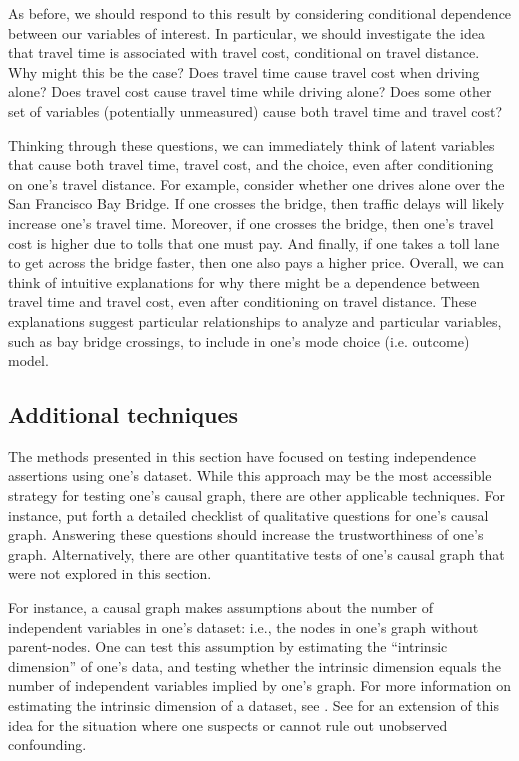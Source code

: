As before, we should respond to this result by considering conditional dependence between our variables of interest.
In particular, we should investigate the idea that travel time is associated with travel cost, conditional on travel distance.
Why might this be the case?
Does travel time cause travel cost when driving alone?
Does travel cost cause travel time while driving alone?
Does some other set of variables (potentially unmeasured) cause both travel time and travel cost?

Thinking through these questions, we can immediately think of latent variables that cause both travel time, travel cost, and the choice, even after conditioning on one's travel distance.
For example, consider whether one drives alone over the San Francisco Bay Bridge.
If one crosses the bridge, then traffic delays will likely increase one's travel time.
Moreover, if one crosses the bridge, then one's travel cost is higher due to tolls that one must pay.
And finally, if one takes a toll lane to get across the bridge faster, then one also pays a higher price.
Overall, we can think of intuitive explanations for why there might be a dependence between travel time and travel cost, even after conditioning on travel distance.
These explanations suggest particular relationships to analyze and particular variables, such as bay bridge crossings, to include in one's mode choice (i.e. outcome) model.

\subsection{Additional techniques}
\label{sec:testing-addendum}

The methods presented in this section have focused on testing independence assertions using one's dataset.
While this approach may be the most accessible strategy for testing one's causal graph, there are other applicable techniques.
For instance, \citet{pitchforth_2013_proposed} put forth a detailed checklist of qualitative questions for one's causal graph.
Answering these questions should increase the trustworthiness of one's graph.
Alternatively, there are other quantitative tests of one's causal graph that were not explored in this section.

For instance, a causal graph makes assumptions about the number of independent variables in one's dataset: i.e., the nodes in one's graph without parent-nodes.
One can test this assumption by estimating the ``intrinsic dimension'' of one's data, and testing whether the intrinsic dimension equals the number of independent variables implied by one's graph.
For more information on estimating the intrinsic dimension of a dataset, see \citet{camastra_2016_intrinsic, song_2019_identification}.
See \citet{chenwei_2019_likelihood} for an extension of this idea for the situation where one suspects or cannot rule out unobserved confounding.

